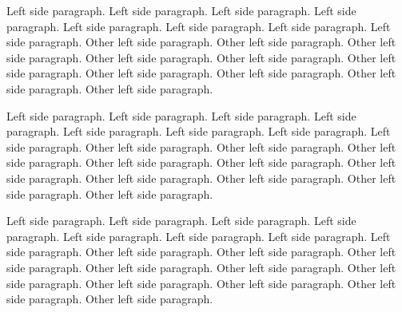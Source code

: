 \documentclass[a5paper,11pt]{article}
\begin{document}
\begin{pages}
\begin{Rightside}
                        \pstart
                Left side paragraph. Left side paragraph. Left side paragraph. Left side paragraph. Left side paragraph. Left side paragraph. Left side paragraph. Left side paragraph.
            \pend
            \pstart
                Other left side paragraph.  Other left side paragraph.  Other left side paragraph.  Other left side paragraph.  Other left side paragraph.  Other left side paragraph.  Other left side paragraph.  Other left side paragraph.  Other left side paragraph.  Other left side paragraph.
            \pend


                        \pstart
                Left side paragraph. Left side paragraph. Left side paragraph. Left side paragraph. Left side paragraph. Left side paragraph. Left side paragraph. Left side paragraph.
            \pend
            \pstart
                Other left side paragraph.  Other left side paragraph.  Other left side paragraph.  Other left side paragraph.  Other left side paragraph.  Other left side paragraph.  Other left side paragraph.  Other left side paragraph.  Other left side paragraph.  Other left side paragraph.
            \pend

                        \pstart
                Left side paragraph. Left side paragraph. Left side paragraph. Left side paragraph. Left side paragraph. Left side paragraph. Left side paragraph. Left side paragraph.
            \pend
            \pstart
                Other left side paragraph.  Other left side paragraph.  Other left side paragraph.  Other left side paragraph.  Other left side paragraph.  Other left side paragraph.  Other left side paragraph.  Other left side paragraph.  Other left side paragraph.  Other left side paragraph.
            \pend



\end{Rightside}
\end{pages}
\end{document}
